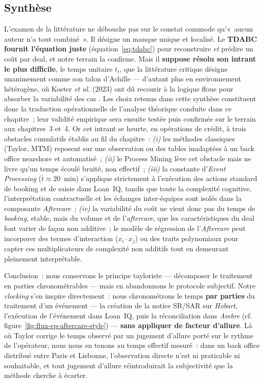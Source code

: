\subsection{Synthèse}
\label{sec:gap}

L'examen de la littérature ne débouche pas sur le constat commode qu'«~aucun auteur n'a
tout combiné~». Il désigne un manque unique et localisé. Le \textbf{TDABC fournit
l'équation juste} (équation~\ref{eq:tdabc}) pour reconstruire \emph{et} prédire un coût
par deal, et notre terrain la confirme. Mais il \textbf{suppose résolu son intrant le plus
difficile}, le temps unitaire $t_i$, que la littérature critique désigne unanimement
comme son talon d'Achille --- d'autant plus en environnement hétérogène, où Koster
\textit{et al.} (2023) ont dû recourir à la logique floue pour absorber la variabilité des
cas \cite{koster2023}. Les choix retenus dans cette synthèse constituent donc la
traduction opérationnelle de l'analyse théorique conduite dans ce chapitre~; leur
validité empirique sera ensuite testée puis confirmée sur le terrain aux chapitres~3 et~4.
Or cet intrant se heurte, en opérations de crédit, à trois obstacles cumulatifs établis au
fil du chapitre~: \emph{(i)} les méthodes classiques (Taylor, MTM) reposent sur une
observation ou des tables inadaptées à un back office nearshore et automatisé~;
\emph{(ii)} le Process Mining lève cet obstacle mais ne livre qu'un temps écoulé bruité,
non effectif~; \emph{(iii)} la constante d'\textit{Event Processing} ($\bar{t} \approx
20$~min) s'applique strictement à l'exécution des actions standard de booking et de saisie
dans Loan~IQ, tandis que toute la complexité cognitive, l'interprétation contractuelle et
les échanges inter-équipes sont isolés dans la composante \textit{Aftercare}~; \emph{(iv)}
la variabilité du coût ne vient donc pas du temps de \textit{booking}, stable, mais du
volume et de l'\textit{aftercare}, que les caractéristiques du deal font varier de façon
non additive~; le modèle de régression de l'\textit{Aftercare} peut incorporer des termes
d'interaction ($x_i \cdot x_j$) ou des traits polynomiaux pour capter ces multiplicateurs
de complexité non additifs tout en demeurant pleinement interprétable.

Conclusion~: nous conservons le principe tayloriste --- décomposer le traitement en
parties chronométrables --- mais en abandonnons le protocole subjectif. Notre
\textit{clocking} s'en inspire directement~: nous chronométrons le temps \textbf{par
parties} du traitement d'un événement --- la création de la notice SR/SAR sur
\textit{Hobart}, l'exécution de l'événement dans Loan~IQ, puis la réconciliation dans
\textit{Ambre} (cf. figure~\ref{fig:flux-ep-aftercare-style}) --- \textbf{sans appliquer de facteur
d'allure}. Là où Taylor corrige le temps observé par un jugement d'allure porté sur le
rythme de l'opérateur, nous nous en tenons au temps effectif mesuré~: dans un back office
distribué entre Paris et Lisbonne, l'observation directe n'est ni praticable ni
souhaitable, et tout jugement d'allure réintroduirait la subjectivité que la méthode
cherche à écarter.


